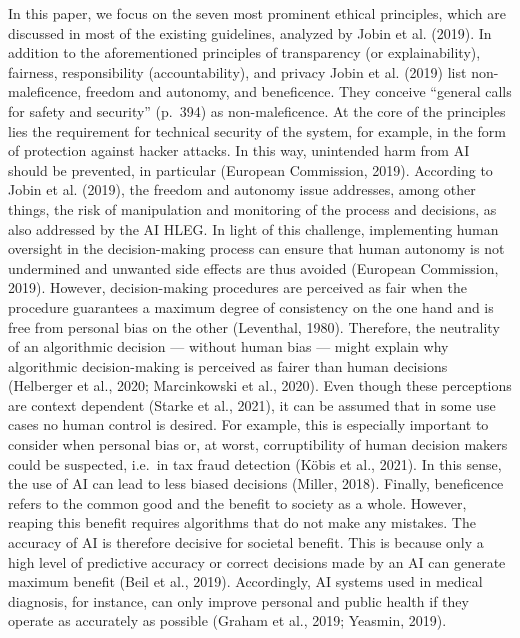 \documentclass{article}
\begin{document}
In this paper, we focus on the seven most prominent ethical principles,
which are discussed in most of the existing guidelines, analyzed by
Jobin et al. (2019). In addition to the aforementioned principles of
transparency (or explainability), fairness, responsibility
(accountability), and privacy Jobin et al. (2019) list non-maleficence,
freedom and autonomy, and beneficence. They conceive ``general calls for
safety and security'' (p.~394) as non-maleficence. At the core of the
principles lies the requirement for technical security of the system,
for example, in the form of protection against hacker attacks. In this
way, unintended harm from AI should be prevented, in particular
(European Commission, 2019). According to Jobin et al. (2019), the
freedom and autonomy issue addresses, among other things, the risk of
manipulation and monitoring of the process and decisions, as also
addressed by the AI HLEG. In light of this challenge, implementing human
oversight in the decision-making process can ensure that human autonomy
is not undermined and unwanted side effects are thus avoided (European
Commission, 2019). However, decision-making procedures are perceived as
fair when the procedure guarantees a maximum degree of consistency on
the one hand and is free from personal bias on the other (Leventhal,
1980). Therefore, the neutrality of an algorithmic decision --- without
human bias --- might explain why algorithmic decision-making is
perceived as fairer than human decisions (Helberger et al., 2020;
Marcinkowski et al., 2020). Even though these perceptions are context
dependent (Starke et al., 2021), it can be assumed that in some use
cases no human control is desired. For example, this is especially
important to consider when personal bias or, at worst, corruptibility of
human decision makers could be suspected, i.e.~in tax fraud detection
(Köbis et al., 2021). In this sense, the use of AI can lead to less
biased decisions (Miller, 2018). Finally, beneficence refers to the
common good and the benefit to society as a whole. However, reaping this
benefit requires algorithms that do not make any mistakes. The accuracy
of AI is therefore decisive for societal benefit. This is because only a
high level of predictive accuracy or correct decisions made by an AI can
generate maximum benefit (Beil et al., 2019). Accordingly, AI systems
used in medical diagnosis, for instance, can only improve personal and
public health if they operate as accurately as possible (Graham et al.,
2019; Yeasmin, 2019).
\end{document}
